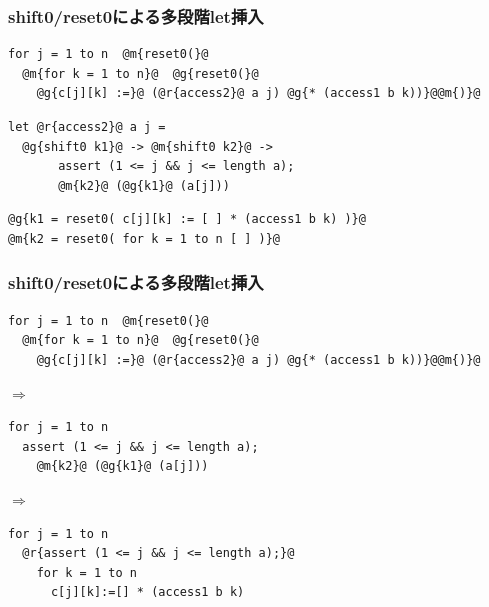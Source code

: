 \documentclass[dvipdfmx,cjk,xcolor=dvipsnames,envcountsect,notheorems,12pt]{beamer}
\theoremstyle{definition}
\begin{document}
\begin{frame}[fragile]
  \frametitle{shift0/reset0による多段階let挿入}

\begin{lstlisting}
for j = 1 to n  @m{reset0(}@
  @m{for k = 1 to n}@  @g{reset0(}@
    @g{c[j][k] :=}@ (@r{access2}@ a j) @g{* (access1 b k))}@@m{)}@
\end{lstlisting}

  \pause

\begin{lstlisting}
let @r{access2}@ a j =
  @g{shift0 k1}@ -> @m{shift0 k2}@ ->
       assert (1 <= j && j <= length a);
       @m{k2}@ (@g{k1}@ (a[j]))
\end{lstlisting}

  \pause

\begin{lstlisting}
@g{k1 = reset0( c[j][k] := [ ] * (access1 b k) )}@
@m{k2 = reset0( for k = 1 to n [ ] )}@
\end{lstlisting}
\end{frame}

\begin{frame}[fragile]
  \frametitle{shift0/reset0による多段階let挿入}

\begin{lstlisting}
for j = 1 to n  @m{reset0(}@
  @m{for k = 1 to n}@  @g{reset0(}@
    @g{c[j][k] :=}@ (@r{access2}@ a j) @g{* (access1 b k))}@@m{)}@
\end{lstlisting}

  \pause
$\Rightarrow$

\begin{lstlisting}
for j = 1 to n
  assert (1 <= j && j <= length a);
    @m{k2}@ (@g{k1}@ (a[j]))
\end{lstlisting}

  \pause
$\Rightarrow$

\begin{lstlisting}
for j = 1 to n
  @r{assert (1 <= j && j <= length a);}@
    for k = 1 to n
      c[j][k]:=[] * (access1 b k)
\end{lstlisting}

\end{frame}
\end{document}
